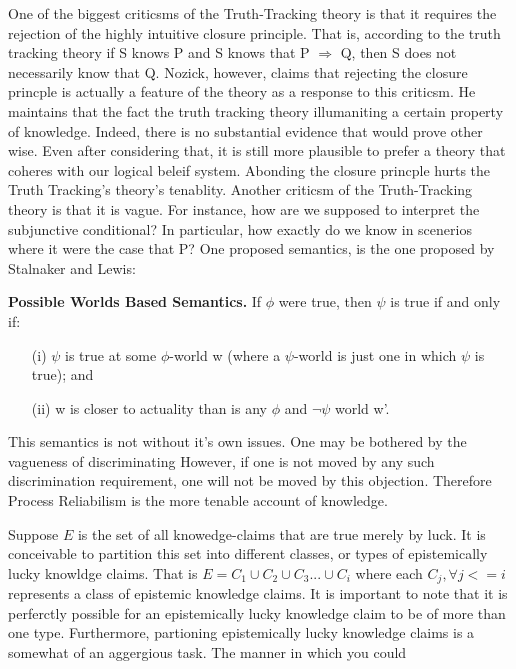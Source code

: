 \documentclass{article}
\begin{document}

One of the biggest criticsms of the Truth-Tracking theory is that it requires
the rejection of the highly intuitive closure principle. That is, according
to the truth tracking theory if S knows P and S  knows that  P $\Rightarrow$ Q,
then S does not necessarily know that Q. Nozick, however, claims that rejecting
the closure princple is actually a feature of the theory as a response to this
criticsm. He maintains that the fact the truth tracking theory illumaniting a
certain property of knowledge. Indeed, there is no substantial evidence that would
prove other wise. Even after considering that, it is still more plausible
to prefer a theory that coheres with our logical beleif system. Abonding the
closure princple hurts the Truth Tracking's theory's tenablity. Another criticsm
of the Truth-Tracking theory is that it is vague. For instance, how are we
supposed to interpret the subjunctive conditional? In particular, how exactly
do we know in scenerios where it were the case that P? One proposed semantics, is
the one proposed by Stalnaker and Lewis:
\begin{displayquote}
  \textbf{Possible Worlds Based Semantics.}
  If $\phi$ were true, then $\psi$ is true if and only if:
  \begin{enumerate}
    \item[(i)] $\psi$ is true at some $\phi$-world w
    (where a $\psi$-world is just one in which $\psi$ is true); and
    \item[(ii)] w is closer to actuality than is any $\phi$ and $\neg \psi$
    world w'.
  \end{enumerate}
\end{displayquote}

This semantics is not without it's own issues. One may be bothered by the vagueness
of discriminating
However, if one is not moved by any such discrimination requirement,
one will not be moved by this objection. Therefore Process Reliabilism
is the more tenable account of knowledge.



Suppose $E$ is the set of all knowedge-claims that are true merely by luck.
It is conceivable to partition this set into different classes, or types
of epistemically lucky knowldge claims. That is $E = C_{1} \cup C_{2} \cup
C_{3} ... \cup C_{i}$ where each $C_{j}, \forall j <= i$ represents a class
of epistemic knowledge claims. It is important to note that it is perferctly
possible for an epistemically lucky knowledge claim to be of more than one type.
Furthermore, partioning epistemically lucky knowledge claims is a somewhat of an
aggergious task. The manner in which you could
\end{document}
